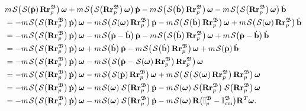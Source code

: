 \begin{align}
    &m\SL[\SL[\dot{\mathbf{p}}]\mathbf{R}\mathbf{r}_p^\mathfrak{B}]\boldsymbol{\omega} + m\SL[\SL[\mathbf{R}\mathbf{r}_p^\mathfrak{B}]\boldsymbol{\omega}]\dot{\mathbf{p}}
    -m\SL[\SL[\dot{\mathbf{b}}]\mathbf{R}\mathbf{r}_p^\mathfrak{B}]\boldsymbol{\omega}  -m\SL[\SL[\mathbf{R}\mathbf{r}_p^\mathfrak{B}]\boldsymbol{\omega}]\dot{\mathbf{b}}\nonumber\\
    &=-m\SL[\SL[\mathbf{R}\mathbf{r}_p^\mathfrak{B}]\dot{\mathbf{p}}]\boldsymbol{\omega}  -m\SL[\SL[\boldsymbol{\omega}]\mathbf{R}\mathbf{r}_p^\mathfrak{B}]\dot{\mathbf{p}}
    -m\SL[\SL[\dot{\mathbf{b}}]\mathbf{R}\mathbf{r}_p^\mathfrak{B}]\boldsymbol{\omega}  +m\SL[\SL[\boldsymbol{\omega}]\mathbf{R}\mathbf{r}_p^\mathfrak{B}]\dot{\mathbf{b}}\nonumber\\
    &=-m\SL[\SL[\mathbf{R}\mathbf{r}_p^\mathfrak{B}]\dot{\mathbf{p}}]\boldsymbol{\omega}
    -m\SL[\dot{\mathbf{p}} - \dot{\mathbf{b}}]\dot{\mathbf{p}}
    -m\SL[\SL[\dot{\mathbf{b}}]\mathbf{R}\mathbf{r}_p^\mathfrak{B}]\boldsymbol{\omega}
    +m\SL[\dot{\mathbf{p}} - \dot{\mathbf{b}}]\dot{\mathbf{b}}\nonumber\\
    &=-m\SL[\SL[\mathbf{R}\mathbf{r}_p^\mathfrak{B}]\dot{\mathbf{p}}]\boldsymbol{\omega}
    +m\SL[\dot{\mathbf{b}}]\dot{\mathbf{p}}
    -m\SL[\SL[\dot{\mathbf{b}}]\mathbf{R}\mathbf{r}_p^\mathfrak{B}]\boldsymbol{\omega}
    +m\SL[\dot{\mathbf{p}}]\dot{\mathbf{b}}\nonumber\\
    &=-m\SL[\SL[\mathbf{R}\mathbf{r}_p^\mathfrak{B}]\dot{\mathbf{p}}]\boldsymbol{\omega}
    -m\SL[\SL[\dot{\mathbf{p}}-\SL[\boldsymbol{\omega}]\mathbf{R}\mathbf{r}_p^\mathfrak{B}]\mathbf{R}\mathbf{r}_p^\mathfrak{B}]\boldsymbol{\omega}\nonumber\\
    &=-m\SL[\SL[\mathbf{R}\mathbf{r}_p^\mathfrak{B}]\dot{\mathbf{p}}]\boldsymbol{\omega}
    -m\SL[\SL[\dot{\mathbf{p}}]\mathbf{R}\mathbf{r}_p^\mathfrak{B}]\boldsymbol{\omega}
    + m\SL[\SL[\SL[\boldsymbol{\omega}]\mathbf{R}\mathbf{r}_p^\mathfrak{B}]\mathbf{R}\mathbf{r}_p^\mathfrak{B}]\boldsymbol{\omega}\nonumber\\
    &=-m\SL[\SL[\mathbf{R}\mathbf{r}_p^\mathfrak{B}]\dot{\mathbf{p}}]\boldsymbol{\omega}
    -m\SL[\boldsymbol{\omega}]\SL[\mathbf{R}\mathbf{r}_p^\mathfrak{B}]\dot{\mathbf{p}}
    - m\SL[\boldsymbol{\omega}]\SL[\mathbf{R}\mathbf{r}_p^\mathfrak{B}]\SL[\mathbf{R}\mathbf{r}_p^\mathfrak{B}]\boldsymbol{\omega}\nonumber\\
    &=-m\SL[\SL[\mathbf{R}\mathbf{r}_p^\mathfrak{B}]\dot{\mathbf{p}}]\boldsymbol{\omega}
    -m\SL[\boldsymbol{\omega}]\SL[\mathbf{R}\mathbf{r}_p^\mathfrak{B}]\dot{\mathbf{p}}
    - m\SL[\boldsymbol{\omega}]\mathbf{R}\bigl(\mathbb{I}^\mathfrak{B}_p-\mathbb{I}^\mathfrak{B}_\text{cm}\bigr)\mathbf{R}^T\boldsymbol{\omega}. \label{eq:partial-torque3}
\end{align}
